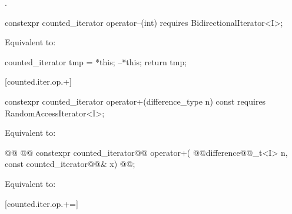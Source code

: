 \begin{addedblock}
\begin{itemdescr}
\pnum
\returns {}.
\end{itemdescr}

%
%
\begin{itemdecl}
  constexpr counted_iterator operator--(int)
    requires BidirectionalIterator<I>;
\end{itemdecl}

\begin{itemdescr}
\pnum
\effects Equivalent to:
\begin{codeblock}
counted_iterator tmp = *this;
--*this;
return tmp;
\end{codeblock}
\end{itemdescr}

[counted.iter.op.+]{}

%
%
\begin{itemdecl}
  constexpr counted_iterator operator+(difference_type n) const
    requires RandomAccessIterator<I>;
\end{itemdecl}

\begin{itemdescr}
\pnum
\oldtxt{\requires} \newtxt{\expects}

\pnum
\effects Equivalent to:
\end{itemdescr}

%
%
\begin{itemdecl}
@@
  @@ constexpr counted_iterator@@ operator+(
    @@difference@@_t<I> n, const counted_iterator@@& x)
      @@;
\end{itemdecl}

\begin{itemdescr}
\pnum
{}

\pnum
\effects Equivalent to:
\end{itemdescr}

[counted.iter.op.+=]{}


\end{addedblock}
